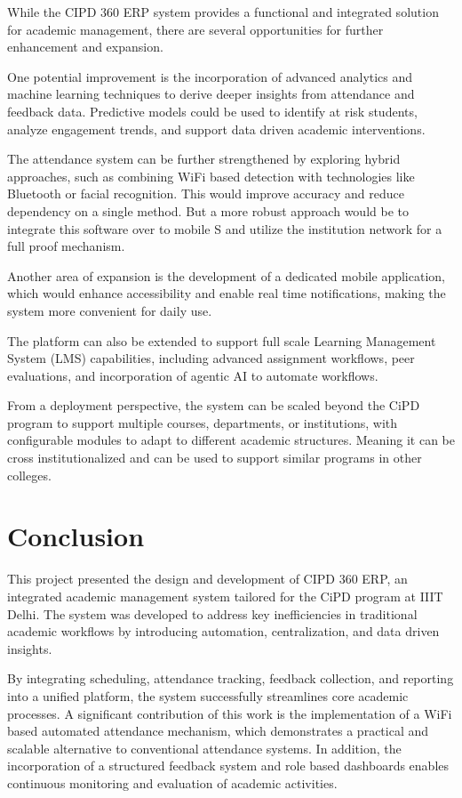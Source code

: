 While the CIPD 360 ERP system provides a functional and integrated solution for academic
management, there are several opportunities for further enhancement and expansion.

One potential improvement is the incorporation of advanced analytics and machine learning
techniques to derive deeper insights from attendance and feedback data. Predictive models could be
used to identify at risk students, analyze engagement trends, and support data driven academic
interventions.

The attendance system can be further strengthened by exploring hybrid approaches, such as
combining WiFi based detection with technologies like Bluetooth or facial recognition. This would
improve accuracy and reduce dependency on a single method. But a more robust approach would be
to integrate this software over to mobile S and utilize the institution network for a full proof
mechanism.

Another area of expansion is the development of a dedicated mobile application, which would
enhance accessibility and enable real time notifications, making the system more convenient for
daily use.

The platform can also be extended to support full scale Learning Management System (LMS)
capabilities, including advanced assignment workflows, peer evaluations, and incorporation of
agentic AI to automate workflows.

From a deployment perspective, the system can be scaled beyond the CiPD program to support
multiple courses, departments, or institutions, with configurable modules to adapt to different
academic structures. Meaning it can be cross institutionalized and can be used to support similar
programs in other colleges.

\chapter{Conclusion}

This project presented the design and development of CIPD 360 ERP, an integrated academic
management system tailored for the CiPD program at IIIT Delhi. The system was developed to
address key inefficiencies in traditional academic workflows by introducing automation,
centralization, and data driven insights.

By integrating scheduling, attendance tracking, feedback collection, and reporting into a unified
platform, the system successfully streamlines core academic processes. A significant contribution of
this work is the implementation of a WiFi based automated attendance mechanism, which
demonstrates a practical and scalable alternative to conventional attendance systems. In addition,
the incorporation of a structured feedback system and role based dashboards enables continuous
monitoring and evaluation of academic activities.

